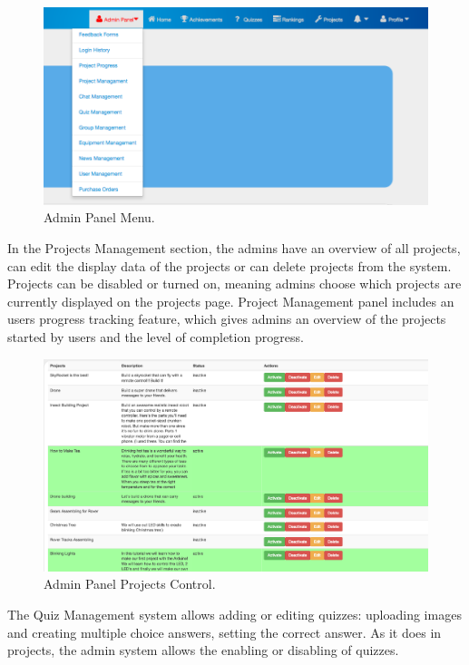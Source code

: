 \begin{figure}
\includegraphics[width=1\linewidth]{images/ui/AdminPanelMenu.png}
\caption{Admin Panel Menu.}
\label{fig:AdminPanelMenu}
\end{figure} 

In the Projects Management section, the admins have an overview of all projects, can edit the display data of the projects or can delete projects from the system. Projects can be
disabled or turned on, meaning admins choose which projects are currently displayed on the projects page. 
Project Management panel includes an users progress tracking feature, which gives admins an overview of the projects started by users and the level of completion progress.
\\

\begin{figure}
\includegraphics[width=1\linewidth]{images/ui/AdminPanelProjects.png}
\caption{Admin Panel Projects Control.}
\label{fig:AdminPanelProjects}
\end{figure} 

The Quiz Management system allows adding or editing quizzes: uploading images and creating multiple choice answers, setting the correct answer. As it does in projects, the admin system allows the enabling or disabling of quizzes.\\

